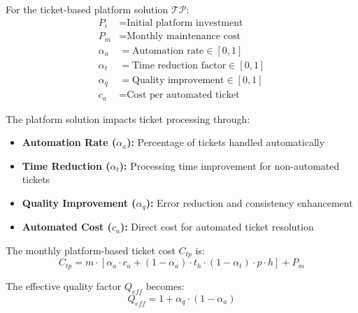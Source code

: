 \documentclass[12pt,a4paper]{article}
\newenvironment{definition}[1]
{\begin{mdframed}[style=definitionstyle,frametitle={Definition: #1}]}
{\end{mdframed}}
\newenvironment{explanation}
{\begin{mdframed}[style=explanationstyle,frametitle={Explanation}]}
{\end{mdframed}}
\begin{document}
\begin{definition}{Ticket Platform Variables}
For the ticket-based platform solution $\mathcal{TP}$:
\begin{align*}
    P_i &= \text{Initial platform investment} \\
    P_m &= \text{Monthly maintenance cost} \\
    \alpha_a &= \text{Automation rate} \in [0,1] \\
    \alpha_t &= \text{Time reduction factor} \in [0,1] \\
    \alpha_q &= \text{Quality improvement} \in [0,1] \\
    c_a &= \text{Cost per automated ticket}
\end{align*}
\end{definition}

\begin{explanation}
The platform solution impacts ticket processing through:
\begin{itemize}
    \item \textbf{Automation Rate ($\alpha_a$):} Percentage of tickets handled automatically
    \item \textbf{Time Reduction ($\alpha_t$):} Processing time improvement for non-automated tickets
    \item \textbf{Quality Improvement ($\alpha_q$):} Error reduction and consistency enhancement
    \item \textbf{Automated Cost ($c_a$):} Direct cost for automated ticket resolution
\end{itemize}
\end{explanation}

\begin{definition}{Platform Ticket Cost}
The monthly platform-based ticket cost $C_{tp}$ is:
\begin{equation}
    C_{tp} = m \cdot [\alpha_a \cdot c_a + (1-\alpha_a) \cdot t_h \cdot (1-\alpha_t) \cdot p \cdot h] + P_m
\end{equation}

The effective quality factor $Q_{eff}$ becomes:
\begin{equation}
    Q_{eff} = 1 + \alpha_q \cdot (1 - \alpha_a)
\end{equation}
\end{definition}
\end{document}
